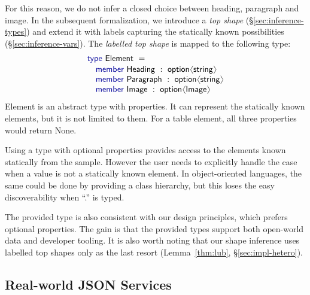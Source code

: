 \documentclass[pldi-cameraready]{sigplanconf-pldi16}
\newcommand{\langl}{\begin{picture}(4.5,7)
\put(1.1,2.5){\rotatebox{60}{\line(1,0){5.5}}}
\put(1.1,2.5){\rotatebox{300}{\line(1,0){5.5}}}
\end{picture}}
\newcommand{\rangl}{\begin{picture}(4.5,7)
\put(.9,2.5){\rotatebox{120}{\line(1,0){5.5}}}
\put(.9,2.5){\rotatebox{240}{\line(1,0){5.5}}}
\end{picture}}
\newcommand{\kvd}[1]{\textnormal{\textcolor{kvdclr}{\sffamily #1}}}
\newcommand{\ident}[1]{\textnormal{\sffamily #1}}
\begin{document}
For this reason, we do not infer a closed choice between heading, paragraph and image. In the
subsequent formalization, we introduce a \emph{top shape} (\S\ref{sec:inference-types}) and extend
it with labels capturing the statically known possibilities (\S\ref{sec:inference-vars}). The
\emph{labelled top shape} is mapped to the following type:
%
\begin{equation*}
\begin{array}{l}
 \kvd{type}~\ident{Element}~=  \\[0.1em]
 \quad \kvd{member}~\ident{Heading}~:~\ident{option}\langl \ident{string} \rangl\\
 \quad \kvd{member}~\ident{Paragraph}~:~\ident{option}\langl \ident{string} \rangl\\
 \quad \kvd{member}~\ident{Image}~:~\ident{option}\langl \ident{Image} \rangl\\
\end{array}
\end{equation*}
%
\ident{Element} is an abstract type with properties. It can represent the statically known
elements, but it is not limited to them. For a table element, all three properties would return
\ident{None}.

Using a type with optional properties provides access to the elements known statically from the
sample. However the user needs to explicitly handle the case when a value is not a statically
known element. In object-oriented languages, the same could be done by providing a class hierarchy,
but this loses the easy discoverability when ``.'' is typed.

The provided type is also consistent with our design principles, which prefers optional properties.
The gain is that the provided types support both open-world data and developer tooling. It is also
worth noting that our shape inference uses labelled top shapes only as the last resort
(Lemma~\ref{thm:lub}, \S\ref{sec:impl-hetero}).


\subsection{Real-world JSON Services}
\label{sec:providers-sum}
\end{document}
